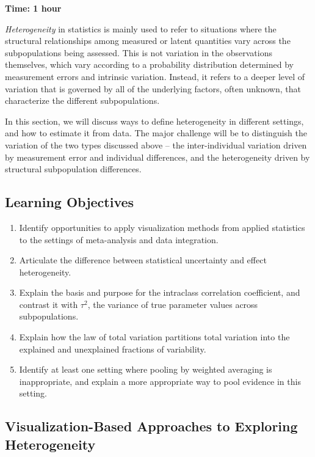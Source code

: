 \textbf{Time: 1 hour}

\textit{Heterogeneity} in statistics is mainly used to refer to situations where the structural relationships among measured or latent quantities vary across the subpopulations being assessed. This is not variation in the observations themselves, which vary according to a probability distribution determined by measurement errors and intrinsic variation. Instead, it refers to a deeper level of variation that is governed by all of the underlying factors, often unknown, that characterize the different subpopulations.

In this section, we will discuss ways to define heterogeneity in different settings, and how to estimate it from data. The major challenge will be to distinguish the variation of the two types discussed above -- the inter-individual variation driven by measurement error and individual differences, and the heterogeneity driven by structural subpopulation differences.

\subsection{Learning Objectives}

\begin{enumerate}
    \item Identify opportunities to apply visualization methods from applied statistics to the settings of meta-analysis and data integration.
    \item Articulate the difference between statistical uncertainty and effect heterogeneity.
    \item Explain the basis and purpose for the intraclass correlation coefficient, and contrast it with $\tau^2$, the variance of true parameter values across subpopulations.
    \item Explain how the law of total variation partitions total variation into the explained and unexplained fractions of variability.
    \item Identify at least one setting where pooling by weighted averaging is inappropriate, and explain a more appropriate way to pool evidence in this setting.
\end{enumerate}

\subsection{Visualization-Based Approaches to Exploring Heterogeneity}

